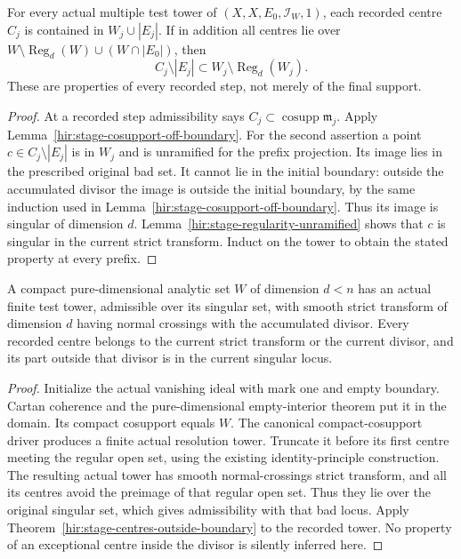 \begin{theorem}
\label{hir:stage-centres-outside-boundary}
\leanok
For every actual multiple test tower of $(X,X,E_0,\mathcal I_W,1)$, each
recorded centre $C_j$ is contained in $W_j\cup|E_j|$. If in addition all
centres lie over
$W\setminus\operatorname{Reg}_d(W)\cup(W\cap|E_0|)$, then
\[
 C_j\setminus|E_j|\subset
 W_j\setminus\operatorname{Reg}_d(W_j).
\]
These are properties of every recorded step, not merely of the final support.
\end{theorem}
\begin{proof}
At a recorded step admissibility says $C_j\subset\operatorname{cosupp}
\mathfrak m_j$. Apply Lemma~\ref{hir:stage-cosupport-off-boundary}.
For the second assertion a point $c\in C_j\setminus|E_j|$ is in $W_j$
and is unramified for the prefix projection. Its image lies in the prescribed
original bad set. It cannot lie in the initial boundary: outside the
accumulated divisor the image is outside the initial boundary, by the same
induction used in Lemma~\ref{hir:stage-cosupport-off-boundary}. Thus its image
is singular of dimension $d$. Lemma~\ref{hir:stage-regularity-unramified}
shows that $c$ is singular in the current strict transform. Induct on the
tower to obtain the stated property at every prefix.
\end{proof}

\begin{theorem}
\label{hir:embedded-stage-positions-off-boundary}
\leanok
A compact pure-dimensional analytic set $W$ of dimension $d<n$ has an actual
finite test tower, admissible over its singular set, with smooth strict
transform of dimension $d$ having normal crossings with the accumulated
divisor. Every recorded centre belongs to the current strict transform or
the current divisor, and its part outside that divisor is in the current
singular locus.
\end{theorem}
\begin{proof}
Initialize the actual vanishing ideal with mark one and empty boundary.
Cartan coherence and the pure-dimensional empty-interior theorem put it in
the domain. Its compact cosupport equals $W$. The canonical compact-cosupport
driver produces a finite actual resolution tower. Truncate it before its
first centre meeting the regular open set, using the existing identity-principle
construction. The resulting actual tower has smooth normal-crossings strict
transform, and all its centres avoid the preimage of that regular open set.
Thus they lie over the original singular set, which gives admissibility with
that bad locus. Apply Theorem~\ref{hir:stage-centres-outside-boundary} to the
recorded tower. No property of an exceptional centre inside the divisor is
silently inferred here.
\end{proof}

